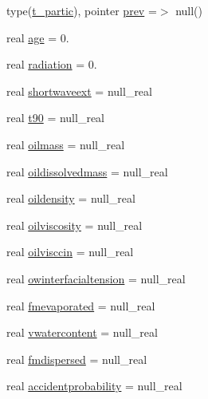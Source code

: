 \begin{DoxyCompactItemize}
\item 
type(\mbox{\hyperlink{structmodulelagrangianglobal_1_1t__partic}{t\+\_\+partic}}), pointer \mbox{\hyperlink{structmodulelagrangianglobal_1_1t__partic_a4d6e73148820411e537c4c2c09c70c1a}{prev}} =$>$ null()
\item 
real \mbox{\hyperlink{structmodulelagrangianglobal_1_1t__partic_a033777cff563f85fae9cba3bc9774676}{age}} = 0.
\item 
real \mbox{\hyperlink{structmodulelagrangianglobal_1_1t__partic_ae7aef24613250b3947e7d9230341ae50}{radiation}} = 0.
\item 
real \mbox{\hyperlink{structmodulelagrangianglobal_1_1t__partic_aaa2bc8ff2222ef5f867ad547ec61adcb}{shortwaveext}} = null\+\_\+real
\item 
real \mbox{\hyperlink{structmodulelagrangianglobal_1_1t__partic_a3f98214cbdd3dc41b0fe92de6d21310b}{t90}} = null\+\_\+real
\item 
real \mbox{\hyperlink{structmodulelagrangianglobal_1_1t__partic_a28e7b51d7d8f9b1d1e211dc4424ecd06}{oilmass}} = null\+\_\+real
\item 
real \mbox{\hyperlink{structmodulelagrangianglobal_1_1t__partic_ad935aaf12b7b49d729ff835031145191}{oildissolvedmass}} = null\+\_\+real
\item 
real \mbox{\hyperlink{structmodulelagrangianglobal_1_1t__partic_a0992faec5af3175b38471211fee6a289}{oildensity}} = null\+\_\+real
\item 
real \mbox{\hyperlink{structmodulelagrangianglobal_1_1t__partic_a4cdd39471c8f5d917cf11e8663c7883e}{oilviscosity}} = null\+\_\+real
\item 
real \mbox{\hyperlink{structmodulelagrangianglobal_1_1t__partic_a509018bb700f2e135e5469ad2967e4dd}{oilvisccin}} = null\+\_\+real
\item 
real \mbox{\hyperlink{structmodulelagrangianglobal_1_1t__partic_ab99e45f44efed60cfe1b3f85dfc9c242}{owinterfacialtension}} = null\+\_\+real
\item 
real \mbox{\hyperlink{structmodulelagrangianglobal_1_1t__partic_a8474e2bdd09571d7ce7549fa7bbac020}{fmevaporated}} = null\+\_\+real
\item 
real \mbox{\hyperlink{structmodulelagrangianglobal_1_1t__partic_a2c2d9ea4ec4441f28a717017297b42bb}{vwatercontent}} = null\+\_\+real
\item 
real \mbox{\hyperlink{structmodulelagrangianglobal_1_1t__partic_a0136a13619304569fc2a60ad296b8da6}{fmdispersed}} = null\+\_\+real
\item 
real \mbox{\hyperlink{structmodulelagrangianglobal_1_1t__partic_ab8547141f63be6f304ae54831429a47f}{accidentprobability}} = null\+\_\+real

\end{DoxyCompactItemize}
